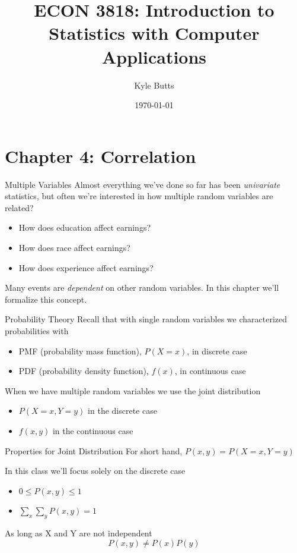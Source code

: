 \documentclass{beamer}
\title{ECON 3818: Introduction to Statistics with Computer Applications}
\date{\today}
\author{Kyle Butts}
\begin{document}
\maketitle

\section{Chapter 4: Correlation}

\begin{frame}{Multiple Variables}
	Almost everything we've done so far has been \textit{univariate} statistics, but often we're interested in how multiple random variables are related?
	\begin{itemize}
		\item How does education affect earnings?
		\item How does race affect earnings?
		\item How does experience affect earnings?
	\end{itemize}
	
	Many events are \textit{dependent} on other random variables. In this chapter we'll formalize this concept.
\end{frame}

\begin{frame}{Probability Theory}
	Recall that with single random variables we characterized probabilities with
	\begin{itemize}
		\item PMF (probability mass function), $P(X=x)$, in discrete case
		\item PDF (probability density function), $f(x)$, in continuous case
	\end{itemize}
	
	When we have multiple random variables we use the \alert{joint distribution}
	\begin{itemize}
		\item $P(X=x, Y=y)$ in the discrete case
		\item $f(x,y)$ in the continuous case
	\end{itemize}
\end{frame}

\begin{frame}{Properties for Joint Distribution}
	For short hand, $P(x,y)=P(X=x, Y=y)$
	
	In this class we'll focus solely on the discrete case
	\begin{itemize}
		\item $0 \leq P(x,y) \leq 1$
		\item $\sum_x \sum_y P(x,y)=1$
	\end{itemize}
	
	As long as X and Y are \alert{not independent}
	$$P(x,y) \neq P(x)P(y)$$
\end{frame}
\end{document}
